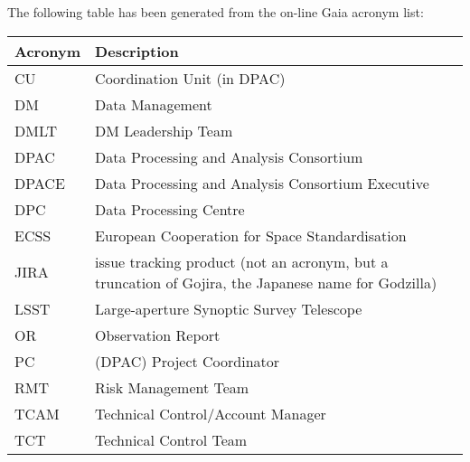 The following table has been generated from the on-line Gaia acronym list:
\newline\newline%
\addtocounter{table}{-1}
\begin{longtable}{|l|p{}|}\hline 
\textbf{Acronym} & \textbf{Description}  \\\hline
CU&Coordination Unit (in DPAC) \\\hline
DM&Data Management \\\hline
DMLT&DM Leadership Team \\\hline
DPAC&Data Processing and Analysis Consortium \\\hline
DPACE&Data Processing and Analysis Consortium Executive \\\hline
DPC&Data Processing Centre \\\hline
ECSS&European Cooperation for Space Standardisation \\\hline
JIRA&issue tracking product (not an acronym, but a truncation of Gojira, the Japanese name for Godzilla) \\\hline
LSST&Large-aperture Synoptic Survey Telescope \\\hline
OR&Observation Report \\\hline
PC&(DPAC) Project Coordinator \\\hline
RMT&Risk Management Team \\\hline
TCAM&Technical Control/Account Manager \\\hline
TCT&Technical Control Team \\\hline
\end{longtable} 
